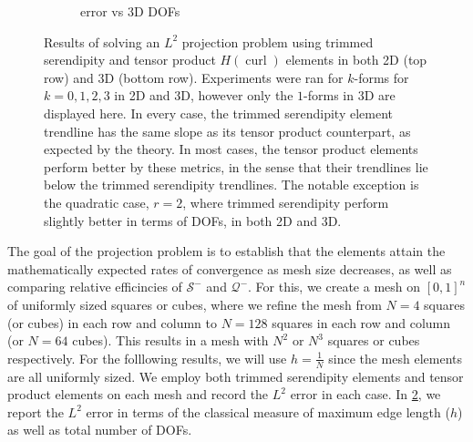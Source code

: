 \documentclass[format=acmsmall,screen,timestamp=false,a4paper]{acmart}
\DeclareMathOperator{\curl}{curl}
\newcommand{\hcurl}{\ensuremath{{H}(\curl ) } }
\begin{document}
\begin{figure}[htbp]
\begin{subfigure}[h]{0.48\textwidth}
    \caption{error vs 3D DOFs\label{fig:3dProjectionDofs}}
  \end{subfigure}
  \caption{Results of solving an $L^2$ projection problem using trimmed serendipity and tensor product \hcurl elements in both 2D (top row) and 3D (bottom row).  Experiments were ran for $k$-forms for $k=0,1,2,3$ in 2D and 3D, however only the $1$-forms in 3D are displayed here.  In every case, the trimmed serendipity element trendline has the same slope as its tensor product counterpart, as expected by the theory.  In most cases, the tensor product elements perform better by these metrics, in the sense that their trendlines lie below the trimmed serendipity trendlines.  The notable exception is the quadratic case, $r=2$, where trimmed serendipity perform slightly better in terms of DOFs, in both 2D and 3D.\label{Projections}} 
\end{figure}

The goal of the projection problem is to establish that the elements attain the mathematically expected rates of convergence as mesh size decreases, as well as comparing relative efficincies of $\mathcal{S}^-$ and $\mathcal{Q}^-$.  For this, we create a mesh on $[0,1]^n$ of uniformly sized squares or cubes, where we refine the mesh from $N=4$ squares (or cubes) in each row and column to $N=128$ squares in each row and column (or $N=64$ cubes).  This results in a mesh with $N^2$ or $N^3$ squares or cubes respectively.  For the folllowing results, we will use $h = \frac{1}{N}$ since the mesh elements are all uniformly sized. 
We employ both trimmed serendipity elements and tensor product elements on each mesh and record the $L^2$ error in each case.  In \cref{Projections}, we report the $L^2$ error in terms of the classical measure of maximum edge length ($h$) as well as total number of  DOFs.
\end{document}
